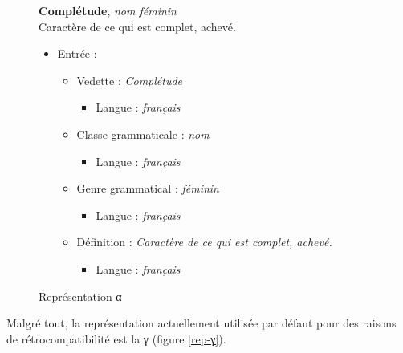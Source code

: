 \documentclass[10pt]{report}
\newcommand{\entité}[1]{\textcolor{blue!80!black}{#1}}
\newcommand{\caractéristique}[1]{\textcolor{green!60!black}{#1}}
\begin{document}
\begin{figure}[H]
	\centering
	\begin{minipage}{0.3\linewidth}
    \textbf{Complétude}, \textit{nom féminin}\\    
    Caractère de ce qui est complet, achevé.
	\end{minipage}%
	\begin{minipage}{0.5\linewidth}
    \begin{itemize}
    	\item \entité{Entrée} :
    	\begin{itemize}
        \item \entité{Vedette} : \textit{Complétude}
        \begin{itemize}
        	\item \caractéristique{Langue} : \textit{français}
        \end{itemize}
        \item \entité{Classe grammaticale} : \textit{nom}
        \begin{itemize}
        	\item \caractéristique{Langue} : \textit{français}
        \end{itemize}
        \item \entité{Genre grammatical} : \textit{féminin}
        \begin{itemize}
        	\item \caractéristique{Langue} : \textit{français}
        \end{itemize}
        \item \entité{Définition} : \textit{Caractère de ce qui est complet, achevé.}
        \begin{itemize}
        	\item \caractéristique{Langue} : \textit{français}
        \end{itemize}
    	\end{itemize}
    \end{itemize}
	\end{minipage}
	\caption{Représentation α}
	\label{rep-α}
\end{figure}

Malgré tout, la représentation actuellement utilisée par défaut pour des raisons de rétrocompatibilité est la γ (figure \ref{rep-γ}).
\end{document}
